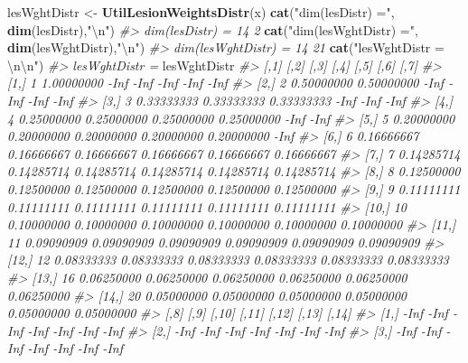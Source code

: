 \documentclass[
]{book}
\newenvironment{Shaded}{\begin{snugshade}}{\end{snugshade}}
\newcommand{\CharTok}[1]{\textcolor[rgb]{0.31,0.60,0.02}{#1}}
\newcommand{\CommentTok}[1]{\textcolor[rgb]{0.56,0.35,0.01}{\textit{#1}}}
\newcommand{\KeywordTok}[1]{\textcolor[rgb]{0.13,0.29,0.53}{\textbf{#1}}}
\newcommand{\NormalTok}[1]{#1}
\newcommand{\StringTok}[1]{\textcolor[rgb]{0.31,0.60,0.02}{#1}}
\begin{document}
\begin{Shaded}
\begin{Highlighting}[]
\NormalTok{lesWghtDistr <-}\StringTok{ }\KeywordTok{UtilLesionWeightsDistr}\NormalTok{(x)}
\KeywordTok{cat}\NormalTok{(}\StringTok{"dim(lesDistr) ="}\NormalTok{, }\KeywordTok{dim}\NormalTok{(lesDistr),}\StringTok{"}\CharTok{\textbackslash{}n}\StringTok{"}\NormalTok{)}
\CommentTok{#> dim(lesDistr) = 14 2}
\KeywordTok{cat}\NormalTok{(}\StringTok{"dim(lesWghtDistr) ="}\NormalTok{, }\KeywordTok{dim}\NormalTok{(lesWghtDistr),}\StringTok{"}\CharTok{\textbackslash{}n}\StringTok{"}\NormalTok{)}
\CommentTok{#> dim(lesWghtDistr) = 14 21}
\KeywordTok{cat}\NormalTok{(}\StringTok{"lesWghtDistr = }\CharTok{\textbackslash{}n\textbackslash{}n}\StringTok{"}\NormalTok{)}
\CommentTok{#> lesWghtDistr =}
\NormalTok{lesWghtDistr}
\CommentTok{#>       [,1]       [,2]       [,3]       [,4]       [,5]       [,6]       [,7]}
\CommentTok{#>  [1,]    1 1.00000000       -Inf       -Inf       -Inf       -Inf       -Inf}
\CommentTok{#>  [2,]    2 0.50000000 0.50000000       -Inf       -Inf       -Inf       -Inf}
\CommentTok{#>  [3,]    3 0.33333333 0.33333333 0.33333333       -Inf       -Inf       -Inf}
\CommentTok{#>  [4,]    4 0.25000000 0.25000000 0.25000000 0.25000000       -Inf       -Inf}
\CommentTok{#>  [5,]    5 0.20000000 0.20000000 0.20000000 0.20000000 0.20000000       -Inf}
\CommentTok{#>  [6,]    6 0.16666667 0.16666667 0.16666667 0.16666667 0.16666667 0.16666667}
\CommentTok{#>  [7,]    7 0.14285714 0.14285714 0.14285714 0.14285714 0.14285714 0.14285714}
\CommentTok{#>  [8,]    8 0.12500000 0.12500000 0.12500000 0.12500000 0.12500000 0.12500000}
\CommentTok{#>  [9,]    9 0.11111111 0.11111111 0.11111111 0.11111111 0.11111111 0.11111111}
\CommentTok{#> [10,]   10 0.10000000 0.10000000 0.10000000 0.10000000 0.10000000 0.10000000}
\CommentTok{#> [11,]   11 0.09090909 0.09090909 0.09090909 0.09090909 0.09090909 0.09090909}
\CommentTok{#> [12,]   12 0.08333333 0.08333333 0.08333333 0.08333333 0.08333333 0.08333333}
\CommentTok{#> [13,]   16 0.06250000 0.06250000 0.06250000 0.06250000 0.06250000 0.06250000}
\CommentTok{#> [14,]   20 0.05000000 0.05000000 0.05000000 0.05000000 0.05000000 0.05000000}
\CommentTok{#>             [,8]       [,9]      [,10]      [,11]      [,12]      [,13]  [,14]}
\CommentTok{#>  [1,]       -Inf       -Inf       -Inf       -Inf       -Inf       -Inf   -Inf}
\CommentTok{#>  [2,]       -Inf       -Inf       -Inf       -Inf       -Inf       -Inf   -Inf}
\CommentTok{#>  [3,]       -Inf       -Inf       -Inf       -Inf       -Inf       -Inf   -Inf}

\end{Highlighting}
\end{Shaded}
\end{document}
